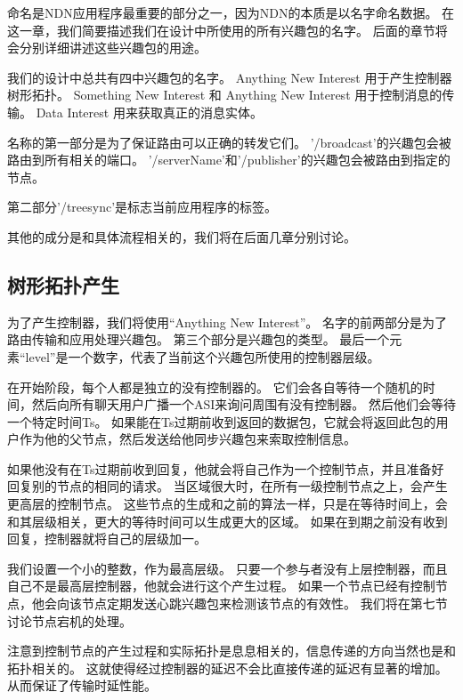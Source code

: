 \documentclass[a4paper]{article}
\begin{document}
命名是NDN应用程序最重要的部分之一，因为NDN的本质是以名字命名数据。
在这一章，我们简要描述我们在设计中所使用的所有兴趣包的名字。
后面的章节将会分别详细讲述这些兴趣包的用途。

我们的设计中总共有四中兴趣包的名字。
Anything New Interest 用于产生控制器树形拓扑。
Something New Interest 和 Anything New Interest 用于控制消息的传输。
Data Interest 用来获取真正的消息实体。

名称的第一部分是为了保证路由可以正确的转发它们。
’/broadcast’的兴趣包会被路由到所有相关的端口。
’/serverName’和’/publisher’的兴趣包会被路由到指定的节点。

第二部分’/treesync’是标志当前应用程序的标签。

其他的成分是和具体流程相关的，我们将在后面几章分别讨论。

\subsection{树形拓扑产生}

为了产生控制器，我们将使用“Anything New Interest”。
名字的前两部分是为了路由传输和应用处理兴趣包。
第三个部分是兴趣包的类型。
最后一个元素“level”是一个数字，代表了当前这个兴趣包所使用的控制器层级。

在开始阶段，每个人都是独立的没有控制器的。
它们会各自等待一个随机的时间，然后向所有聊天用户广播一个ASI来询问周围有没有控制器。
然后他们会等待一个特定时间Ts。
如果能在Ts过期前收到返回的数据包，它就会将返回此包的用户作为他的父节点，然后发送给他同步兴趣包来索取控制信息。

如果他没有在Ts过期前收到回复，他就会将自己作为一个控制节点，并且准备好回复别的节点的相同的请求。
当区域很大时，在所有一级控制节点之上，会产生更高层的控制节点。
这些节点的生成和之前的算法一样，只是在等待时间上，会和其层级相关，更大的等待时间可以生成更大的区域。
如果在到期之前没有收到回复，控制器就将自己的层级加一。

我们设置一个小的整数，作为最高层级。
只要一个参与者没有上层控制器，而且自己不是最高层控制器，他就会进行这个产生过程。
如果一个节点已经有控制节点，他会向该节点定期发送心跳兴趣包来检测该节点的有效性。
我们将在第七节讨论节点宕机的处理。

注意到控制节点的产生过程和实际拓扑是息息相关的，信息传递的方向当然也是和拓扑相关的。
这就使得经过控制器的延迟不会比直接传递的延迟有显著的增加。
从而保证了传输时延性能。
\end{document}
